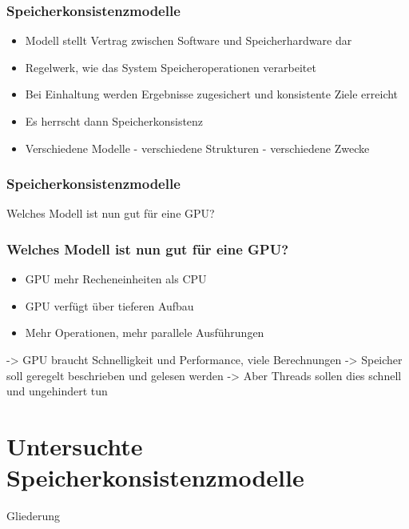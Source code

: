 \documentclass{sikslides}
\begin{document}
\begin{frame}
	\frametitle{Speicherkonsistenzmodelle}
	\begin{itemize}
		\item Modell stellt Vertrag zwischen Software und Speicherhardware dar
\bigskip
		\item Regelwerk, wie das System Speicheroperationen verarbeitet
\bigskip
		\item Bei Einhaltung werden Ergebnisse zugesichert und konsistente Ziele erreicht
\bigskip
		\item Es herrscht dann Speicherkonsistenz
\bigskip
		\item Verschiedene Modelle -  verschiedene Strukturen - verschiedene Zwecke
	\end{itemize}
\end{frame}


\begin{frame}
\frametitle{Speicherkonsistenzmodelle}
	Welches Modell ist nun gut für eine GPU?
\end{frame}

\begin{frame}
	\frametitle{Welches Modell ist nun gut für eine GPU?}
	\begin{itemize}
		\item GPU mehr Recheneinheiten als CPU
\bigskip
		\item GPU verfügt über tieferen Aufbau
\bigskip
		\item Mehr Operationen, mehr parallele Ausführungen
	\end{itemize}
	\bigskip
	-> GPU braucht Schnelligkeit und Performance, viele Berechnungen
	\newline 
\bigskip
-> Speicher soll geregelt beschrieben und gelesen werden
\newline
\bigskip
-> Aber Threads sollen dies schnell und ungehindert tun
\end{frame}




\section{Untersuchte Speicherkonsistenzmodelle}
\begin{frame}{Gliederung}
   
    	\tableofcontents[currentsection, subsectionstyle=show/show/hide]
\end{frame}
\end{document}
